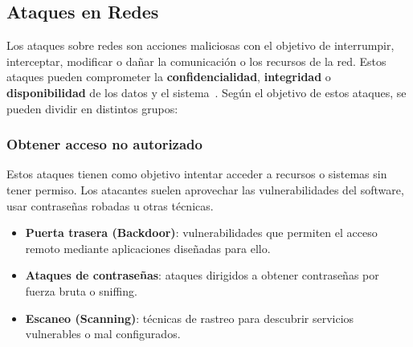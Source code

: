\subsection{Ataques en Redes}
\label{subsec:Ataques}
Los ataques sobre redes son acciones maliciosas con el objetivo de interrumpir, interceptar, modificar o dañar la comunicación o los recursos de la red. Estos ataques pueden comprometer la \textbf{confidencialidad}, \textbf{integridad} o \textbf{disponibilidad} de los datos y el sistema~\cite{ataques}. Según el objetivo de estos ataques, se pueden dividir en distintos grupos:

\subsubsection{Obtener acceso no autorizado}
\label{subsubsec:AccessoNoAutorizado}
Estos ataques tienen como objetivo intentar acceder a recursos o sistemas sin tener permiso. Los atacantes suelen aprovechar las vulnerabilidades del software, usar contraseñas robadas u otras técnicas.
\begin{itemize}
    \item \textbf{Puerta trasera (Backdoor)}: vulnerabilidades que permiten el acceso remoto mediante aplicaciones diseñadas para ello.
    \item \textbf{Ataques de contraseñas}: ataques dirigidos a obtener contraseñas por fuerza bruta o sniffing.
    \item \textbf{Escaneo (Scanning)}: técnicas de rastreo para descubrir servicios vulnerables o mal configurados.
\end{itemize}

